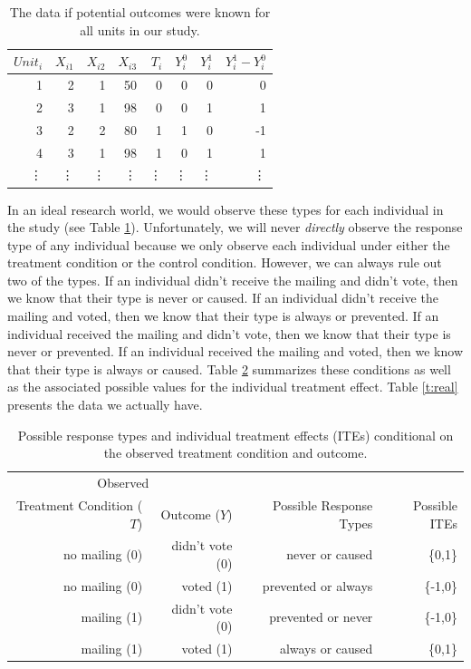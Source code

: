 \documentclass{article}
\begin{document}
\begin{table}
\begin{center}
\caption{\label{t:ideal} The data if potential outcomes were known for all units in our study.}
\begin{tabular}{r|rrr|r|r|r|r}
$Unit_i$ & $X_{i1}$ & $X_{i2}$ & $X_{i3}$ & $T_i $ & $Y_i^0$ & $Y_i^1$ & $Y_i^1-Y_i^0$ \\
\hline
1 & 2 & 1 & 50 & 0 & 0 & 0 & 0 \\ 
2 & 3 & 1 & 98 & 0 & 0 & 1 & 1 \\ 
3 & 2 & 2 & 80 & 1 & 1 & 0 & -1 \\ 
4 & 3 & 1 & 98 & 1 & 0 & 1 & 1\\
\vdots &  \vdots &\vdots &\vdots &\vdots &\vdots &\vdots & \vdots  \\
\end{tabular}
\end{center}
\end{table}





In an ideal research world, we would observe these types for each individual in the study (see Table \ref{t:ideal}). Unfortunately, we will never \emph{directly} observe the response type of any individual because we only observe each individual under either the treatment condition or the control condition. However, we can always rule out two of the types. If an individual didn't receive the mailing and didn't vote, then we know that their type is never or caused. If an individual didn't receive the mailing and voted, then we know that their type is always or prevented. If an individual received the mailing and didn't vote, then we know that their type is never or prevented. If an individual received the mailing and voted, then we know that their type is always or caused. Table \ref{t:anhh} summarizes these conditions as well as the associated possible values for the individual treatment effect. Table \ref{t:real} presents the data we actually have.

\begin{table}
\begin{center}
\caption{\label{t:anhh} Possible response types and individual treatment effects (ITEs) conditional on the observed treatment condition and outcome.}
\begin{tabular}{rr | r | r}
\hline \hline
\multicolumn{2}{c|}{Observed} & & \\
Treatment Condition ($T$) & Outcome ($Y$) & Possible Response Types & Possible ITEs \\
\hline
no mailing (0) & didn't vote (0) & never or caused & \{0,1\} \\
no mailing (0)& voted (1) & prevented or always & \{-1,0\} \\
mailing (1)& didn't vote (0) & prevented or never & \{-1,0\} \\
mailing (1)& voted (1) & always or caused & \{0,1\} \\
\hline \hline
\end{tabular}
\end{center}
\end{table}
\end{document}
